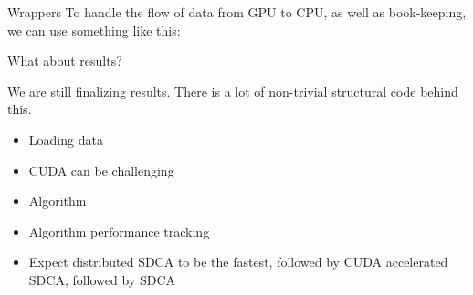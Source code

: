 \documentclass{beamer}
\begin{document}
\begin{frame}{Wrappers}
  To handle the flow of data from GPU to CPU, as well as book-keeping, we can
  use something like this:
\end{frame}

\begin{frame}[standout]
  What about results?
\end{frame}

\begin{frame}
  We are still finalizing results. There is a lot of non-trivial structural code
  behind this.
  \begin{itemize}
    \item Loading data \pause
    \item CUDA can be challenging \pause
    \item Algorithm \pause
    \item Algorithm performance tracking \pause
    \item Expect distributed SDCA to be the fastest, followed by CUDA
      accelerated SDCA, followed by SDCA
  \end{itemize}
\end{frame}

	

\end{document}
